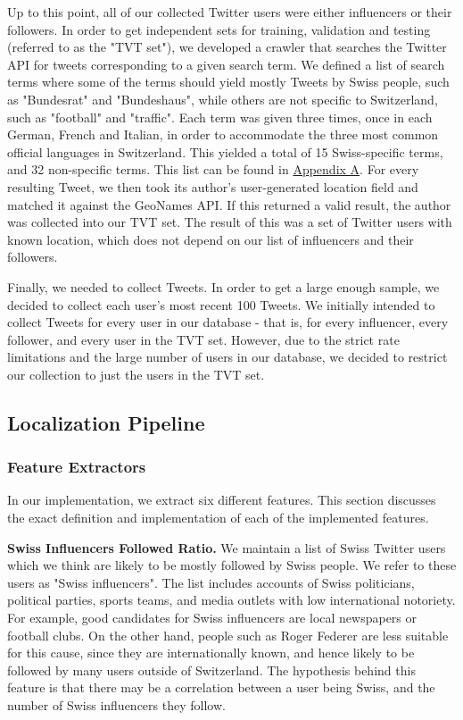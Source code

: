 \documentclass[10pt,a4paper]{article}
\begin{document}
Up to this point, all of our collected Twitter users were either influencers or their followers. In order to get independent sets for training, validation and testing (referred to as the "TVT set"), we developed a crawler that searches the Twitter API for tweets corresponding to a given search term. We defined a list of search terms where some of the terms should yield mostly Tweets by Swiss people, such as "Bundesrat" and "Bundeshaus", while others are not specific to Switzerland, such as "football" and "traffic". Each term was given three times, once in each German, French and Italian, in order to accommodate the three most common official languages in Switzerland. This yielded a total of 15 Swiss-specific terms, and 32 non-specific terms. This list can be found in \hyperref[sec:appendix-searchterms]{Appendix A}. For every resulting Tweet, we then took its author's user-generated location field and matched it against the GeoNames API. If this returned a valid result, the author was collected into our TVT set. The result of this was a set of Twitter users with known location, which does not depend on our list of influencers and their followers.

Finally, we needed to collect Tweets. In order to get a large enough sample, we decided to collect each user's most recent 100 Tweets. We initially intended to collect Tweets for every user in our database - that is, for every influencer, every follower, and every user in the TVT set. However, due to the strict rate limitations and the large number of users in our database, we decided to restrict our collection to just the users in the TVT set.

\subsection{Localization Pipeline}
\subsubsection{Feature Extractors}
In our implementation, we extract six different features. This section discusses the exact definition and implementation of each of the implemented features.

\textbf{Swiss Influencers Followed Ratio.} We maintain a list of Swiss Twitter users which we think are likely to be mostly followed by Swiss people. We refer to these users as "Swiss influencers". The list includes accounts of Swiss politicians, political parties, sports teams, and media outlets with low international notoriety. For example, good candidates for Swiss influencers are local newspapers or football clubs. On the other hand, people such as Roger Federer are less suitable for this cause, since they are internationally known, and hence likely to be followed by many users outside of Switzerland. The hypothesis behind this feature is that there may be a correlation between a user being Swiss, and the number of Swiss influencers they follow.
\end{document}
